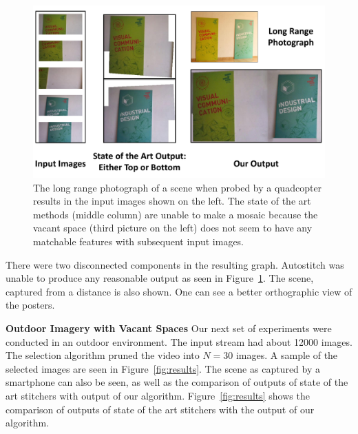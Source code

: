 \documentclass[11pt]{article}
\begin{document}
\begin{figure}[t!]
  \centering
  \includegraphics[width=\textwidth]{mosaicing/figures/teaser.pdf}
  \caption{ \label{fig:teaser} The long range photograph of a scene when probed
    by a quadcopter results in the input images shown on the left.  The
    state of the art methods (middle column) are unable to make a mosaic because the
    vacant space (third picture on the left) does not seem to have any
    matchable features with subsequent input images.}
\end{figure}

There were two disconnected components in the resulting graph.
Autostitch was unable to produce any reasonable output as seen in
Figure~\ref{fig:teaser}.  The scene, captured from a distance is also
shown.  One can see a better orthographic view of the posters.
\vspace{0.5cm}

\noindent\textbf{Outdoor Imagery with Vacant Spaces}
Our next set of experiments were conducted in an outdoor
environment. The input stream had about 12000 images. The selection
algorithm pruned the video into $N=30$ images. A sample of the
selected images are seen in Figure~\ref{fig:results}.  The scene as
captured by a smartphone can also be seen, as well as the comparison
of outputs of state of the art stitchers with output of our
algorithm. Figure~\ref{fig:results} shows the comparison of outputs of
state of the art stitchers with the output of our algorithm.
\end{document}
